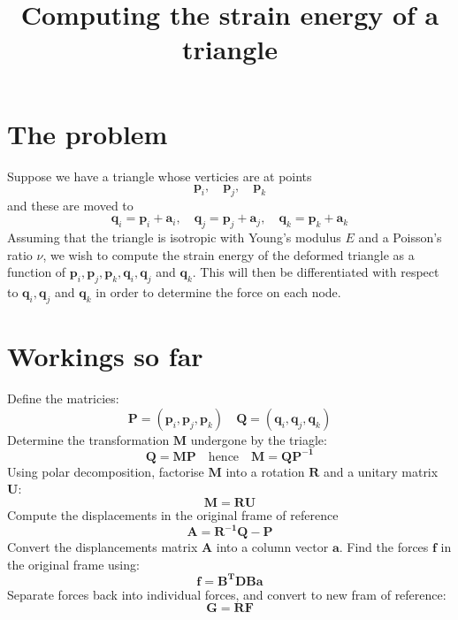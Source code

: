 \documentclass{article}
\title{Computing the strain energy of a triangle}
\renewcommand{\vec}[1]{\mathbf{#1}}
\begin{document}
\section{The problem}
\label{fem:sec:problem}

Suppose we have a triangle whose verticies are at points
\begin{displaymath}
  \vec{p}_i,\quad
  \vec{p}_j,\quad
  \vec{p}_k
\end{displaymath}
and these are moved to 
\begin{displaymath}
  \vec{q}_i=\vec{p}_i+\vec{a}_i,\quad
  \vec{q}_j=\vec{p}_j+\vec{a}_j,\quad
  \vec{q}_k=\vec{p}_k+\vec{a}_k
\end{displaymath}
Assuming that the triangle is isotropic with Young's modulus $E$ and a
Poisson's ratio $\nu$, we wish to compute the strain energy of the
deformed triangle as a function of $\vec{p}_i, \vec{p}_j, \vec{p}_k,
\vec{q}_i, \vec{q}_j$ and $\vec{q}_k$. This will then be differentiated
with respect to $\vec{q}_i, \vec{q}_j$ and $\vec{q}_k$ in order to
determine the force on each node.

\section{Workings so far}
\label{fem:sec:workings-so-far}

Define the matricies:
\begin{displaymath}
  \vec{P} = \left(\vec{p}_i, \vec{p}_j, \vec{p}_k\right) \quad
  \vec{Q} = \left(\vec{q}_i, \vec{q}_j, \vec{q}_k\right)    
\end{displaymath}
Determine the transformation $\vec{M}$ undergone by the triagle:
\begin{displaymath}
  \vec{Q} = \vec{M}\vec{P} \quad \mbox{hence} \quad
  \vec{M} = \vec{Q}\vec{P^{-1}}
\end{displaymath}
Using polar decomposition, factorise $\vec{M}$ into a rotation
$\vec{R}$ and a unitary matrix $\vec{U}$:
\begin{displaymath}
  \vec{M} = \vec{R}\vec{U}
\end{displaymath}
Compute the displacements in the original frame of reference
\begin{displaymath}
  \vec{A} = \vec{R^{-1}}\vec{Q} - \vec{P}
\end{displaymath}
Convert the displancements matrix $\vec{A}$ into a column vector
$\vec{a}$. Find the forces $\vec{f}$ in the original frame using:
\begin{displaymath}
  \vec{f} = \vec{B^T}\vec{D}\vec{B}\vec{a}
\end{displaymath}
Separate forces back into individual forces, and convert to new fram
of reference:
\begin{displaymath}
  \vec{G} = \vec{R}\vec{F}
\end{displaymath}
\end{document}
